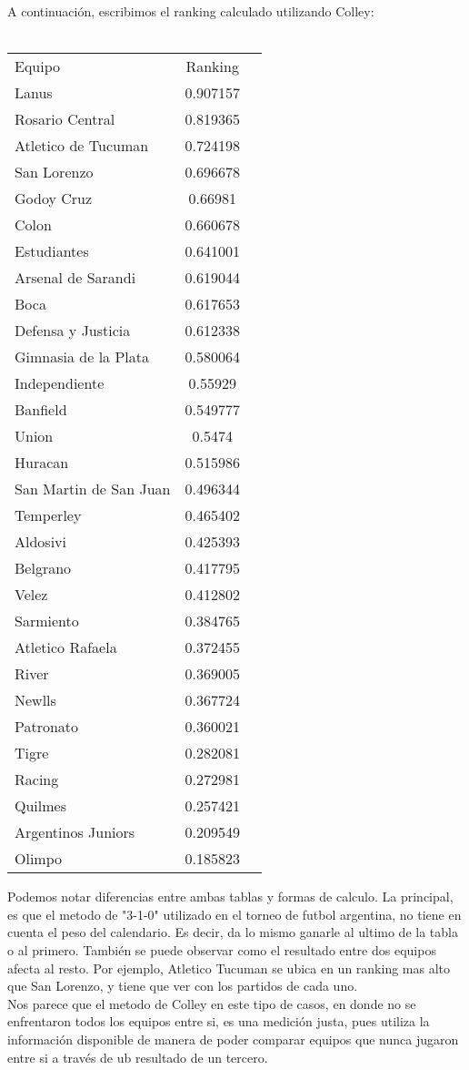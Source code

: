 A continuaci\'on, escribimos el ranking calculado utilizando Colley: \\
\\

\begin{tabular}{ l c r}
Equipo & Ranking \\
Lanus & 0.907157 \\
Rosario Central &	0.819365 \\
Atletico de Tucuman & 0.724198 \\
San Lorenzo &	0.696678 \\
Godoy Cruz &	0.66981 \\
Colon & 0.660678 \\
Estudiantes & 0.641001 \\
Arsenal de Sarandi & 0.619044 \\
Boca &	0.617653 \\
Defensa y Justicia & 0.612338 \\
Gimnasia de la Plata & 0.580064 \\
Independiente & 0.55929 \\
Banfield & 0.549777 \\
Union & 0.5474 \\
Huracan & 0.515986 \\
San Martin de San Juan & 0.496344 \\
Temperley & 0.465402 \\
Aldosivi & 0.425393 \\
Belgrano & 0.417795 \\
Velez & 0.412802 \\
Sarmiento &	0.384765 \\
Atletico Rafaela & 0.372455 \\
River &	0.369005 \\
Newlls &	0.367724 \\
Patronato &	0.360021 \\
Tigre	 & 0.282081 \\
Racing &	0.272981 \\
Quilmes &	0.257421 \\
Argentinos Juniors & 	0.209549 \\
Olimpo &	0.185823 \\

\end{tabular}

Podemos notar diferencias entre ambas tablas y formas de calculo. La principal, es que el metodo de "3-1-0" utilizado en el torneo de futbol argentina, no tiene en cuenta el peso del calendario. Es decir, da lo mismo ganarle al ultimo de la tabla o al primero. Tambi\'en se puede observar como el resultado entre dos equipos afecta al resto. Por ejemplo, Atletico Tucuman se ubica en un ranking mas alto que San Lorenzo, y tiene que ver con los partidos de cada uno.\\
Nos parece que el metodo de Colley en este tipo de casos, en donde no se enfrentaron todos los equipos entre si, es una medici\'on justa, pues utiliza la informaci\'on disponible de manera de poder comparar equipos que nunca jugaron entre si a trav\'es de ub resultado de un tercero.

